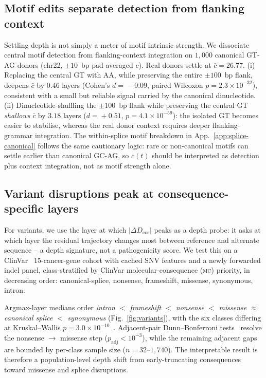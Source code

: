 \documentclass{article}
\theoremstyle{plain}
\theoremstyle{definition}
\theoremstyle{remark}
\newcommand{\DDcos}{\Delta D_{\cos}}
\begin{document}
\subsection{Motif edits separate detection from flanking context}
\label{sec:motif-controls}

Settling depth is not simply a meter of motif intrinsic strength. We dissociate central motif detection from flanking-context integration on $1{,}000$ canonical GT-AG donors (chr22, $\pm 10$~bp pad-averaged $c$). Real donors settle at $\bar c\!=\!26.77$. (i) Replacing the central GT with AA, while preserving the entire $\pm 100$~bp flank, deepens $\bar c$ by $0.46$ layers (Cohen's $d\!=\!-0.09$, paired Wilcoxon $p\!=\!2.3\!\times\!10^{-32}$), consistent with a small but reliable signal carried by the canonical dinucleotide. (ii) Dinucleotide-shuffling the $\pm 100$~bp flank while preserving the central GT \emph{shallows} $\bar c$ by $3.18$ layers ($d\!=\!+0.51$, $p\!=\!4.1\!\times\!10^{-59}$): the isolated GT becomes easier to stabilise, whereas the real donor context requires deeper flanking-grammar integration. The within-splice motif breakdown in App.~\ref{app:splice-canonical} follows the same cautionary logic: rare or non-canonical motifs can settle earlier than canonical GC-AG, so $c(t)$ should be interpreted as detection plus context integration, not as motif strength alone.

\subsection{Variant disruptions peak at consequence-specific layers}
\label{sec:variant-disruption}

For variants, we use the layer at which $|\DDcos|$ peaks as a depth probe: it asks at which layer the residual trajectory changes most between reference and alternate sequence -- a depth signature, not a pathogenicity score. We test this on a ClinVar~\cite{landrum2020clinvar} 15-cancer-gene cohort with cached SNV features and a newly forwarded indel panel, class-stratified by ClinVar molecular-consequence (\textsc{mc}) priority, in decreasing order: canonical-splice, nonsense, frameshift, missense, synonymous, intron.

Argmax-layer medians order \emph{intron $<$ frameshift $<$ nonsense $<$ missense $\approx$ canonical splice $<$ synonymous} (Fig.~\ref{fig:variants}), with the six classes differing at Kruskal--Wallis $p\!=\!3.0\!\times\!10^{-10}$~\cite{kruskal1952wallis}. Adjacent-pair Dunn--Bonferroni tests~\cite{mann1947whitney,benjamini1995fdr} resolve the nonsense $\to$ missense step ($p_{\mathrm{adj}}\!<\!10^{-3}$), while the remaining adjacent gaps are bounded by per-class sample size ($n\!=\!32$--$1{,}740$). The interpretable result is therefore a population-level depth shift from early-truncating consequences toward missense and splice disruptions.
\end{document}
